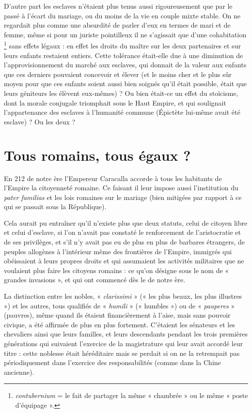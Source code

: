  D'autre part les esclaves n'étaient plus tenus aussi rigoureusement que par le passé à l'écart du mariage, ou du moins de la vie en couple mixte stable. On ne regardait plus comme une absurdité de parler d'eux en termes de mari et de femme, même si pour un juriste pointilleux il ne s'agissait que d'une cohabitation%
\footnote{\emph{contubernium} = le fait de partager la même « chambrée » ou le même « poste d'équipage ».}
sans effets légaux : en effet les droits du maître sur les deux partenaires et sur leurs enfants restaient entiers. Cette tolérance était-elle due à une diminution de l'approvisionnement du marché aux esclaves, qui donnait de la valeur aux enfants que ces derniers pouvaient concevoir et élever (et le moins cher et le plus sûr moyen pour que ces enfants soient aussi bien soignés qu'il était possible, était que leurs géniteurs les élèvent eux-mêmes) ? Ou bien était-ce un effet du stoïcisme, dont la morale conjugale triomphait sous le Haut Empire, et qui soulignait l'appartenance des esclaves à l'humanité commune ({Épictète} lui-même avait été esclave) ? Ou les deux ? 
 
 
\section{Tous romains, tous égaux ?}

 En 212 de notre ère l'Empereur Caracalla accorde à tous les habitants de l'Empire la citoyenneté romaine. Ce faisant il leur impose aussi l'institution du \emph{pater familias} et les lois romaines sur le mariage (bien mitigées par rapport à ce qui se passait sous la République). 

 Cela aurait pu entraîner qu'il n'existe plus que deux statuts, celui de citoyen libre et celui d'esclave, si l'on n'avait pas constaté le renforcement de l'aristocratie et de ses privilèges, et s'il n'y avait pas eu de plus en plus de barbares étrangers, de peuples allogènes à l'intérieur même des frontières de l'Empire, immigrés qui obéissaient à leurs propres droits et qui assumaient les activités militaires que ne voulaient plus faire les citoyens romains : ce qu'on désigne sous le nom de « grandes invasions », et qui ont commencé dès le  de notre ère. 

 La distinction entre les nobles, « \emph{clarissimi} » (« les plus beaux, les plus illustres ») et les autres, tous qualifiés de « \emph{humili} » (« humbles ») ou de « \emph{pauperes} » (pauvres), même quand ils étaient financièrement à l'aise, mais sans pouvoir civique, a été affirmée de plus en plus fortement. C'étaient les sénateurs et les chevaliers ainsi que leurs familles, et leurs descendants pendant les trois premières générations qui suivaient l'exercice de la magistrature qui leur avait accordé leur titre : cette noblesse était héréditaire mais se perdait si on ne la retrempait pas périodiquement dans l'exercice des responsabilités (comme dans la Chine ancienne).

